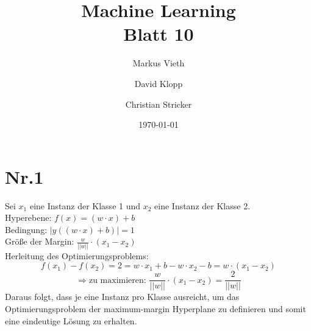 \documentclass[a4paper,11pt,twoside]{scrartcl}
\title{Machine Learning\\ Blatt 10}
\author{Markus Vieth\and David Klopp\and Christian Stricker}
\date{\today}
\begin{document}
\newcommand{\cor}[1]{\textcolor{red}{\textit{#1}}}
\maketitle
\cleardoublepage
\pagestyle{myheadings}

\newpage

\section*{Nr.1}
Sei $x_1$ eine Instanz der Klasse 1 und $x_2$ eine Instanz der Klasse 2.\\
Hyperebene: $f(x) = (w\cdot x) + b$\\
Bedingung: $|y((w\cdot x) +b)| = 1$\\
Größe der Margin: $\frac{w}{||w||} \cdot (x_1 - x_2)$\\
Herleitung des Optimierungsproblems:
\[ f(x_1) - f(x_2) = 2 = w\cdot x_1 + b - w\cdot x_2 - b = w\cdot(x_1-x_2) \]
\[ \Rightarrow \text{zu maximieren: }\frac{w}{||w||}\cdot(x_1 - x_2) = \frac{2}{||w||} \]
Daraus folgt, dass je eine Instanz pro Klasse ausreicht, um das Optimierungsproblem der maximum-margin Hyperplane zu definieren und somit eine eindeutige Lösung zu erhalten. 
\end{document}
